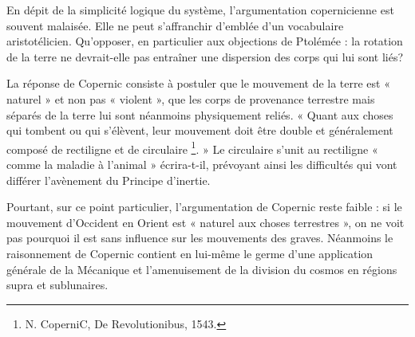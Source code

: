 En dépit de la simplicité logique du système, l’argumentation copernicienne
est souvent malaisée. Elle ne peut s’affranchir d’emblée d’un
vocabulaire aristotélicien. Qu’opposer, en particulier aux objections de
Ptolémée : la rotation de la terre ne devrait-elle pas entraîner une dispersion
des corps qui lui sont liés?

La réponse de Copernic consiste à postuler que le mouvement de la
terre est « naturel » et non pas « violent », que les corps de provenance
terrestre mais séparés de la terre lui sont néanmoins physiquement
reliés. « Quant aux choses qui tombent ou qui s’élèvent, leur mouvement
doit être double et généralement composé de rectiligne et de circulaire \footnote{N. CoperniC, De Revolutionibus, 1543.}. »
Le circulaire s’unit au rectiligne « comme la maladie à l’animal »
écrira-t-il, prévoyant ainsi les difficultés qui vont différer l’avènement
du Principe d’inertie.

Pourtant, sur ce point particulier, l’argumentation de Copernic
reste faible : si le mouvement d'Occident en Orient est « naturel aux
choses terrestres », on ne voit pas pourquoi il est sans influence sur les
mouvements des graves. Néanmoins le raisonnement de Copernic contient
en lui-même le germe d’une application générale de la Mécanique
et l’amenuisement de la division du cosmos en régions supra et sublunaires.

